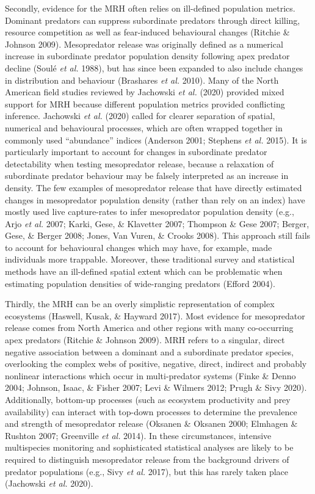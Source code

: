 \documentclass[11pt,a4paper,titlepage,twoside,openright]{style/unimelbthesis}
\begin{document}
\begin{mainmatter}
Secondly, evidence for the MRH often relies on ill-defined population metrics. Dominant predators can suppress subordinate predators through direct killing, resource competition as well as fear-induced behavioural changes (Ritchie \& Johnson 2009). Mesopredator release was originally defined as a numerical increase in subordinate predator population density following apex predator decline (Soulé \emph{et al.} 1988), but has since been expanded to also include changes in distribution and behaviour (Brashares \emph{et al.} 2010). Many of the North American field studies reviewed by Jachowski \emph{et al.} (2020) provided mixed support for MRH because different population metrics provided conflicting inference. Jachowski \emph{et al.} (2020) called for clearer separation of spatial, numerical and behavioural processes, which are often wrapped together in commonly used ``abundance'' indices (Anderson 2001; Stephens \emph{et al.} 2015). It is particularly important to account for changes in subordinate predator detectability when testing mesopredator release, because a relaxation of subordinate predator behaviour may be falsely interpreted as an increase in density. The few examples of mesopredator release that have directly estimated changes in mesopredator population density (rather than rely on an index) have mostly used live capture-rates to infer mesopredator population density (e.g., Arjo \emph{et al.} 2007; Karki, Gese, \& Klavetter 2007; Thompson \& Gese 2007; Berger, Gese, \& Berger 2008; Jones, Van Vuren, \& Crooks 2008). This approach still fails to account for behavioural changes which may have, for example, made individuals more trappable. Moreover, these traditional survey and statistical methods have an ill-defined spatial extent which can be problematic when estimating population densities of wide-ranging predators (Efford 2004).

Thirdly, the MRH can be an overly simplistic representation of complex ecosystems (Haswell, Kusak, \& Hayward 2017). Most evidence for mesopredator release comes from North America and other regions with many co-occurring apex predators (Ritchie \& Johnson 2009). MRH refers to a singular, direct negative association between a dominant and a subordinate predator species, overlooking the complex webs of positive, negative, direct, indirect and probably nonlinear interactions which occur in multi-predator systems (Finke \& Denno 2004; Johnson, Isaac, \& Fisher 2007; Levi \& Wilmers 2012; Prugh \& Sivy 2020). Additionally, bottom-up processes (such as ecosystem productivity and prey availability) can interact with top-down processes to determine the prevalence and strength of mesopredator release (Oksanen \& Oksanen 2000; Elmhagen \& Rushton 2007; Greenville \emph{et al.} 2014). In these circumstances, intensive multispecies monitoring and sophisticated statistical analyses are likely to be required to distinguish mesopredator release from the background drivers of predator populations (e.g., Sivy \emph{et al.} 2017), but this has rarely taken place (Jachowski \emph{et al.} 2020).


\end{mainmatter}
\end{document}
